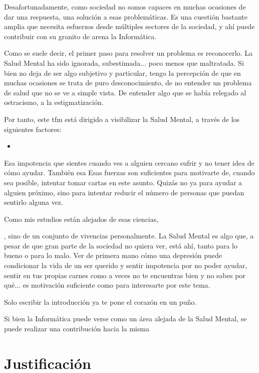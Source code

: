 Desafortunadamente, como sociedad no somos capaces en muchas ocasiones de dar una respuesta, una solución a esas problemáticas. Es una cuestión bastante amplia que necesita esfuerzos desde múltiples sectores de la sociedad, y ahí puede contribuir con su granito de arena la Informática.

Como se suele decir, el primer paso para resolver un problema es reconocerlo. La Salud Mental ha sido ignorada, subestimada... poco menos que maltratada. Si bien no deja de ser algo subjetivo y particular, tengo la percepción de que en muchas ocasiones se trata de puro desconocimiento, de no entender un problema de salud que no se ve a simple vista. De entender algo que se había relegado al ostracismo, a la estigmatización. 

Por tanto, este \gls{tfm} está dirigido a visibilizar la Salud Mental, a través de los siguientes factores:

\begin{itemize}
    \item 
\end{itemize}


Esa impotencia que sientes cuando ves a alguien cercano sufrir y no tener idea de cómo ayudar. También esa  Esas fuerzas son suficientes para motivarte de, cuando sea posible, intentar tomar cartas en este asunto. Quizás no ya para ayudar a alguien próximo, sino para intentar reducir el número de personas que puedan sentirlo alguna vez. 

Como mis estudios están alejados de esas ciencias, 


, sino de un conjunto de vivencias personalmente. La Salud Mental es algo que, a pesar de que gran parte de la sociedad no quiera ver, está ahí, tanto para lo bueno o para lo malo. Ver de primera mano cómo una depresión puede condicionar la vida de un ser querido y sentir impotencia por no poder ayudar, sentir en tus propias carnes como a veces no te encuentras bien y no sabes por qué... es motivación suficiente como para interesarte por este tema.

Solo escribir la introducción ya te pone el corazón en un puño.

Si bien la Informática puede verse como un área alejada de la Salud Mental, se puede realizar una contribución hacia la misma

\section{Justificación}

